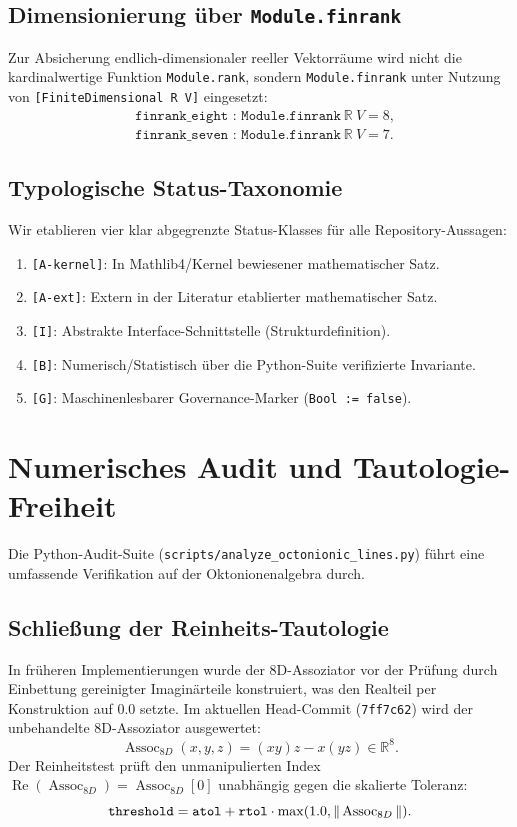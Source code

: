 \documentclass[11pt,a4paper]{article}
\theoremstyle{definition}
\newcommand{\Assoc}{\operatorname{Assoc}}
\newcommand{\RePart}{\operatorname{Re}}
\begin{document}
	\subsection{Dimensionierung über \texttt{Module.finrank}}
	Zur Absicherung endlich-dimensionaler reeller Vektorräume wird nicht die kardinalwertige Funktion \texttt{Module.rank}, sondern \texttt{Module.finrank} unter Nutzung von \texttt{[FiniteDimensional R V]} eingesetzt:
	\begin{align*}
		&\texttt{finrank\_eight : Module.finrank}\ \mathbb{R}\ V = 8, \\
		&\texttt{finrank\_seven : Module.finrank}\ \mathbb{R}\ V = 7.
	\end{align*}
	
	\subsection{Typologische Status-Taxonomie}
	Wir etablieren vier klar abgegrenzte Status-Klasses für alle Repository-Aussagen:
	\begin{enumerate}
		\item \texttt{[A-kernel]}: In Mathlib4/Kernel bewiesener mathematischer Satz.
		\item \texttt{[A-ext]}: Extern in der Literatur etablierter mathematischer Satz.
		\item \texttt{[I]}: Abstrakte Interface-Schnittstelle (Strukturdefinition).
		\item \texttt{[B]}: Numerisch/Statistisch über die Python-Suite verifizierte Invariante.
		\item \texttt{[G]}: Maschinenlesbarer Governance-Marker (\texttt{Bool := false}).
	\end{enumerate}
	
	\section{Numerisches Audit und Tautologie-Freiheit}
	
	Die Python-Audit-Suite (\texttt{scripts/analyze\_octonionic\_lines.py}) führt eine umfassende Verifikation auf der Oktonionenalgebra durch.
	
	\subsection{Schließung der Reinheits-Tautologie}
	In früheren Implementierungen wurde der 8D-Assoziator vor der Prüfung durch Einbettung gereinigter Imaginärteile konstruiert, was den Realteil per Konstruktion auf $0.0$ setzte. Im aktuellen Head-Commit (\texttt{7ff7c62}) wird der unbehandelte 8D-Assoziator ausgewertet:
	\begin{equation}
		\Assoc_{8D}(x,y,z) = (xy)z - x(yz) \in \mathbb{R}^8.
	\end{equation}
	Der Reinheitstest prüft den unmanipulierten Index $\RePart(\Assoc_{8D}) = \Assoc_{8D}[0]$ unabhängig gegen die skalierte Toleranz:
	\begin{equation}
		\text{\texttt{threshold}} = \text{\texttt{atol}} + \text{\texttt{rtol}} \cdot \max(1.0, \|\Assoc_{8D}\|).
	\end{equation}
	
\end{document}
